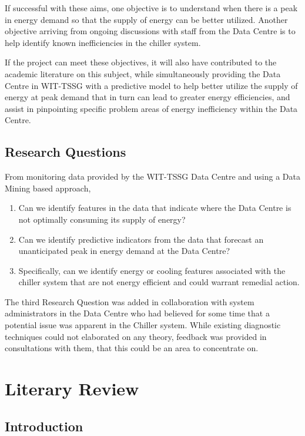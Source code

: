 \documentclass[12pt]{scrartcl}
\begin{document}
If successful with these aims, one objective is to understand when there is a peak in energy demand so that the supply of energy can be better utilized. Another objective arriving from ongoing discussions with staff from the Data Centre is to help identify known inefficiencies in the chiller system.  

If the project can meet these objectives, it will also have contributed to the academic literature on this subject, while simultaneously providing the Data Centre in WIT-TSSG with a predictive model to help better utilize the supply of energy at peak demand that in turn can lead to greater energy efficiencies, and assist in pinpointing specific problem areas of energy inefficiency within the Data Centre. 
 

\subsection{Research Questions}
\label{subsec:[Research Questions]}

From monitoring data provided by the WIT-TSSG Data Centre and using a Data Mining based approach,
\begin{enumerate}
  \item Can we identify features in the data that indicate where the Data Centre is not optimally consuming its supply of energy?
    \item Can we identify predictive indicators from the data that forecast an unanticipated peak in energy demand at the Data Centre?
  \item Specifically, can we identify energy or cooling features associated with the chiller system that are not energy efficient and could warrant remedial action.  


\end{enumerate}

The third Research Question was added in collaboration with system administrators in the Data Centre who had believed for some time that a potential issue was apparent in the Chiller system. While existing diagnostic techniques could not elaborated on any theory, feedback was provided in consultations with them, that this could be an area to concentrate on.      

\section{Literary Review}
\label{sec:[Literary Review]}

\subsection{Introduction}
\label{subsec:[Introduction]}
\end{document}
